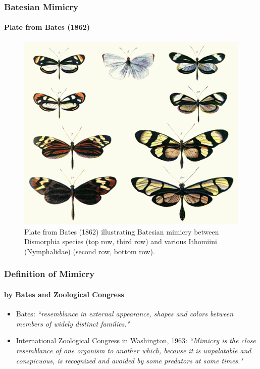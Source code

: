 \frame
{
	\frametitle{Batesian Mimicry}
	\framesubtitle{Plate from Bates (1862)}
	
	\begin{figure}[H]
		\centering
		\includegraphics[scale=0.6]{../tex/images/Batesplate_ArM}
		\caption{Plate from Bates (1862) illustrating Batesian mimicry between Dismorphia species (top row, third row) and various Ithomiini (Nymphalidae) (second row, bottom row).}
		\label{fig:batesian-butterfly}
	\end{figure}
}

\frame
{
	\frametitle{Definition of Mimicry}
	\framesubtitle{by Bates and Zoological Congress}
	
	\begin{itemize}
		\item Bates: \textsl{``resemblance in external appearance, shapes and colors between members of widely distinct families."}
		\item International Zoological Congress in Washington, 1963: \textsl{``Mimicry is the close resemblance of one organism to another which, because it is unpalatable and conspicuous, is recognized and avoided by some predators at some times."}
	\end{itemize}
}

